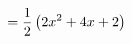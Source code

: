 \documentclass[preview]{standalone}
\begin{document}
\begin{align*}
\special{dvisvgm:raw <g id='unique000'>}=\frac{1}{2}\left(2x^2+4x+2\right)\special{dvisvgm:raw </g>}
\end{align*}
\end{document}

